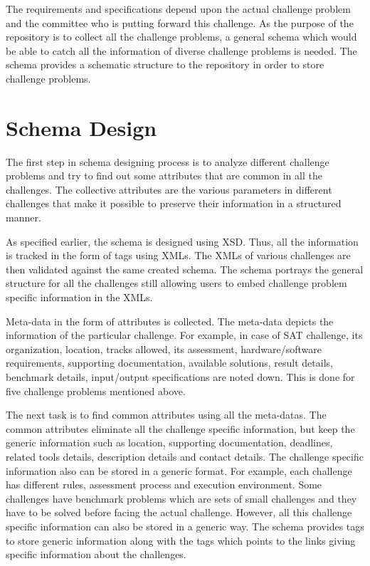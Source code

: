 \documentclass[11pt,letterpaper]{report}
\begin{document}
The requirements and specifications depend upon the actual challenge problem and the committee who is putting forward this challenge. As the purpose of the repository is to collect all the challenge problems, a general schema which would be able to catch all the information of diverse challenge problems is needed. The schema provides a schematic structure to the repository in order to store challenge problems.  

\section{Schema Design} 
The first step in schema designing process is to analyze different challenge problems and try to find out some attributes that are common in all the challenges. The collective attributes are the various parameters in different challenges that make it possible to preserve their information in a structured manner. 

As specified earlier, the schema is designed using XSD. Thus, all the information is tracked in the form of tags using XMLs. The XMLs of various challenges are then validated against the same created schema. The schema portrays the general structure for all the challenges still allowing users to embed challenge problem specific information in the XMLs. 

Meta-data in the form of attributes is collected. The meta-data depicts the information of the particular challenge. For example, in case of SAT challenge, its organization, location, tracks allowed, its assessment, hardware/software requirements, supporting documentation, available solutions, result details, benchmark details, input/output specifications are noted down. This is done for five challenge problems mentioned above. 

The next task is to find common attributes using all the meta-datas. The common attributes eliminate all the challenge specific information, but keep the generic information such as location, supporting documentation, deadlines, related tools details, description details and contact details. The challenge specific information also can be stored in a generic format. For example, each challenge has different rules, assessment process and execution environment. Some challenges have benchmark problems which are sets of small challenges and they have to be solved before facing the actual challenge. However, all this challenge specific information can also be stored in a generic way. The schema provides tags to store generic information along with the tags which points to the links giving specific information about the challenges.
\end{document}
